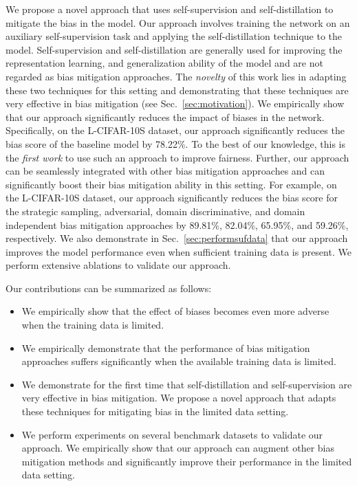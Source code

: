 \documentclass[10pt,twocolumn,letterpaper]{article}
\begin{document}
 We propose a novel approach that uses self-supervision and self-distillation to mitigate the bias in the model. Our approach involves training the network on an auxiliary self-supervision task and applying the self-distillation technique to the model. Self-supervision and self-distillation are generally used for improving the representation learning, and generalization ability of the model and are not regarded as bias mitigation approaches. The \textit{novelty} of this work lies in adapting these two techniques for this setting and demonstrating that these techniques are very effective in bias mitigation (see Sec.~\ref{sec:motivation}). We empirically show that our approach significantly reduces the impact of biases in the network. Specifically, on the L-CIFAR-10S dataset, our approach significantly reduces the bias score of the baseline model by 78.22\%. To the best of our knowledge, this is the \textit{first work} to use such an approach to improve fairness. Further, our approach can be seamlessly integrated with other bias mitigation approaches and can significantly boost their bias mitigation ability in this setting. For example, on the L-CIFAR-10S dataset, our approach significantly reduces the bias score for the strategic sampling, adversarial, domain discriminative, and domain independent bias mitigation approaches by 89.81\%, 82.04\%, 65.95\%, and 59.26\%, respectively. We also demonstrate in Sec.~\ref{sec:performsufdata} that our approach improves the model performance even when sufficient training data is present. We perform extensive ablations to validate our approach.
 
Our contributions can be summarized as follows:
\begin{itemize}
    \item We empirically show that the effect of biases becomes even more adverse when the training data is limited.
    
    \item We empirically demonstrate that the performance of bias mitigation approaches suffers significantly when the available training data is limited.
    
    \item We demonstrate for the first time that self-distillation and self-supervision are very effective in bias mitigation. We propose a novel approach that adapts these techniques for mitigating bias in the limited data setting. 
    
    \item  We perform experiments on several benchmark datasets to validate our approach. We empirically show that our approach can augment other bias mitigation methods and significantly improve their performance in the limited data setting.
\end{itemize}
\end{document}
